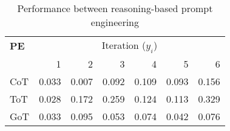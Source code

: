 \begin{table}[!h]
\centering
\caption{Performance between reasoning-based prompt engineering}
\label{tab:reasoning_prompt}
\begin{tabular}{p{1.8cm}|rrrrrr}
\toprule
\textbf{PE} & \multicolumn{6}{c}{Iteration ($y_{i}$)} \\
 & 1 & 2 & 3 & 4 & 5 & 6 \\
\midrule
CoT & 0.033 & 0.007 & 0.092 & 0.109 & 0.093 & 0.156 \\
ToT & 0.028 & 0.172 & 0.259 & 0.124 & 0.113 & 0.329 \\
GoT & 0.033 & 0.095 & 0.053 & 0.074 & 0.042 & 0.076 \\
\bottomrule
\end{tabular}
\end{table}